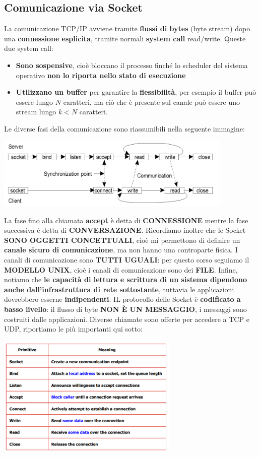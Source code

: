 \documentclass[12pt]{article}
\begin{document}
\subsection{Comunicazione via Socket}
La comunicazione TCP/IP avviene tramite \textbf{flussi di bytes} (byte stream) dopo una \textbf{connessione esplicita}, tramite normali \textbf{system call} read/write.
Queste due system call:
\begin{itemize}
    \item \textbf{Sono sospensive}, cioè bloccano il processo finché lo scheduler del sistema operativo \textbf{non lo riporta nello stato di esecuzione}
    \item \textbf{Utilizzano un buffer} per garantire la \textbf{flessibilità}, per esempio il buffer può essere lungo $N$ caratteri, ma ciò che è presente sul canale può essere uno stream lungo $k < N$ caratteri.
\end{itemize}
Le diverse fasi della comunicazione sono riassumibili nella seguente immagine:
\begin{center}
    \includegraphics[width = 0.85\textwidth]{Images/24.png}
\end{center}
La fase fino alla chiamata \textbf{accept} è detta di \textbf{CONNESSIONE} mentre la fase successiva è detta di \textbf{CONVERSAZIONE}. Ricordiamo inoltre che le Socket \textbf{SONO OGGETTI CONCETTUALI}, cioè mi permettono di definire un \textbf{canale sicuro di comunicazione}, ma non hanno una controparte fisica. I canali di comunicazione sono \textbf{TUTTI UGUALI}: per questo corso seguiamo il \textbf{MODELLO UNIX}, cioè i canali di comunicazione sono dei \textbf{FILE}. Infine, notiamo che \textbf{le capacità di lettura e scrittura di un sistema dipendono anche dall'infrastruttura di rete sottostante}, tuttavia le applicazioni dovrebbero esserne \textbf{indipendenti}. \newline
IL protocollo delle Socket è \textbf{codificato a basso livello}: il flusso di byte \textbf{NON È UN MESSAGGIO}, i messaggi sono costruiti dalle applicazioni. \newline
Diverse chiamate sono offerte per accedere a TCP e UDP, riportiamo le più importanti qui sotto:
\begin{center}
    \includegraphics[width = 0.65\textwidth]{Images/25.png}
\end{center}
\end{document}
